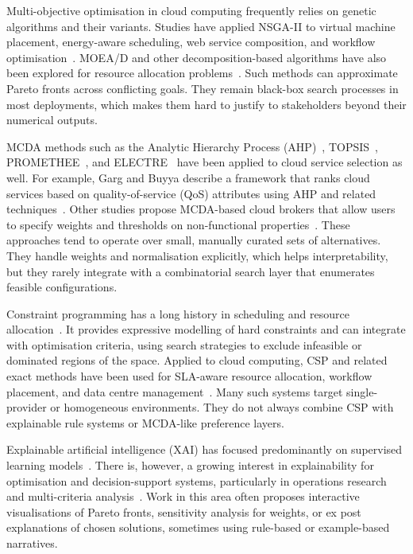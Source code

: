\documentclass[journal]{IEEEtran}
\begin{document}
Multi-objective optimisation in cloud computing frequently relies on genetic
algorithms and their variants. Studies have applied NSGA-II to virtual machine
placement, energy-aware scheduling, web service composition, and workflow
optimisation~\cite{deb_nsga2,zeng_marketoriented,wu_market}. MOEA/D and other
decomposition-based algorithms have also been explored for resource allocation
problems~\cite{zhang_moead}. Such methods can approximate Pareto fronts across
conflicting goals. They remain black-box search processes in most deployments,
which makes them hard to justify to stakeholders beyond their numerical outputs.

MCDA methods such as the Analytic Hierarchy Process (AHP)~\cite{saaty_ahp},
TOPSIS~\cite{hwang_madm}, PROMETHEE~\cite{brans_promethee}, and
ELECTRE~\cite{roy_electre} have been applied to cloud service selection as well.
For example, Garg and Buyya describe a framework that ranks cloud services based
on quality-of-service (QoS) attributes using AHP and related
techniques~\cite{garg_framework}. Other studies propose MCDA-based cloud brokers
that allow users to specify weights and thresholds on non-functional
properties~\cite{zhan_selection,han_multicriteria}. These approaches tend to
operate over small, manually curated sets of alternatives. They handle weights
and normalisation explicitly, which helps interpretability, but they rarely
integrate with a combinatorial search layer that enumerates feasible
configurations.

Constraint programming has a long history in scheduling and resource
allocation~\cite{rossi_handbook,baptiste_csp}. It provides expressive modelling
of hard constraints and can integrate with optimisation criteria, using search
strategies to exclude infeasible or dominated regions of the space. Applied to
cloud computing, CSP and related exact methods have been used for SLA-aware
resource allocation, workflow placement, and data centre
management~\cite{sharma_sla,fersman_csp}. Many such systems target
single-provider or homogeneous environments. They do not always combine CSP with
explainable rule systems or MCDA-like preference layers.

Explainable artificial intelligence (XAI) has focused predominantly on
supervised learning models~\cite{ribeiro_lime,guidotti_survey,doshi_rigorous}.
There is, however, a growing interest in explainability for optimisation and
decision-support systems, particularly in operations research and multi-criteria
analysis~\cite{miettinen_multiobjective,schoen_explainable,hauser_explanatory}.
Work in this area often proposes interactive visualisations of Pareto fronts,
sensitivity analysis for weights, or ex post explanations of chosen solutions,
sometimes using rule-based or example-based narratives.
\end{document}
